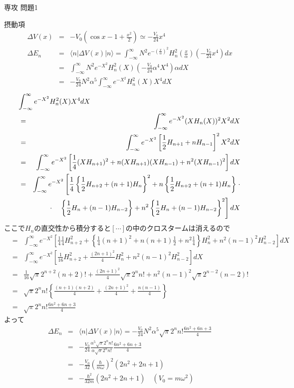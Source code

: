 \documentclass[fleqn]{jbook}
\begin{document}
\begin{answer}{専攻 問題1}{}
\begin{subanswers}
\begin{subsubanswers}
\SubSubAnswer
摂動項
\begin{eqnarray*}
\Delta V(x)&=&-V_{0}\left(\cos x -1+\frac{x^{2}}{2}\right)
\simeq -\frac{V_{0}}{24}x^{4}\\
\Delta E_{n}&=&\langle n|\Delta V(x)|n\rangle
=\int_{-\infty}^{\infty}N^{2}e^{-
\left(\frac{x}{\alpha}\right)^{2}}H_{n}^{2}\left(\frac{x}{\alpha}\right)
\left(-\frac{V_{0}}{24}x^{4}\right)dx\\
&=&\int_{-\infty}^{\infty}N^{2}e^{-X^{2}}H_{n}^{2}(X)\left(-\frac{V_{0}}{24}
\alpha^{4}X^{4}\right)\alpha dX\\
&=&-\frac{V_{0}}{24}N^{2}\alpha^{5}\int_{-\infty}^{\infty}e^{-X^{2}}H_{n}^{2}(X)X^{4}dX
\end{eqnarray*}
\begin{eqnarray*}
\lefteqn{\int_{-\infty}^{\infty}e^{-X^{2}}H_{n}^{2}(X)X^{4}dX}&&\\
&=&\int_{-\infty}^{\infty}e^{-X^{2}}(XH_{n}(X))^{2}X^{2}dX\\
&=&\int_{-\infty}^{\infty}e^{-X^{2}}\left[
\frac{1}{2}H_{n+1}+nH_{n-1}\right]^{2}X^{2}dX\\
&=&\int_{-\infty}^{\infty}e^{-X^{2}}\left[\frac{1}{4}(XH_{n+1})^{2}
+n(XH_{n+1})(XH_{n-1})+n^{2}(XH_{n-1})^{2}\right]dX\\
&=&\int_{-\infty}^{\infty}e^{-X^{2}}\left[\frac{1}{4}\left\{\frac{1}{2}H_{n+2}
+(n+1)H_{n}\right\}^{2}+n\left\{
\frac{1}{2}H_{n+2}+(n+1)H_{n}\right\}\right.\cdot\\
&&\cdot\left.\quad\left\{\frac{1}{2}H_{n}+(n-1)
H_{n-2}\right\}+n^{2}\left\{\frac{1}{2}H_{n}+(n-1)H_{n-2}\right\}^{2}\right]dX
\end{eqnarray*}
ここで$H_{n}$の直交性から積分すると$[\cdots]$の中のクロスタームは消えるので
\begin{eqnarray*}
&=&\int_{-\infty}^{\infty}e^{-X^{2}}\left[\frac{1}{4}\frac{1}{4}H_{n+2}^{2}
+\left\{\frac{1}{4}(n+1)^{2}+n(n+1)\frac{1}{2}+n^{2}\frac{1}{4}\right\}
H_{n}^{2}
+n^{2}(n-1)^{2}H_{n-2}^{2}\right]dX\\
&=&\int_{-\infty}^{\infty}e^{-X^{2}}\left[\frac{1}{16}H_{n+2}^{2}
+\frac{(2n+1)^{2}}{4}H_{n}^{2}+n^{2}(n-1)^{2}H_{n-2}^{2}\right]dX\\
&=&\frac{1}{16}\sqrt{\pi}2^{n+2}(n+2)!+\frac{(2n+1)^{2}}{4}\sqrt{\pi}2^{n}n!+
n^{2}(n-1)^{2}\sqrt{\pi}2^{n-2}(n-2)!\\
&=&\sqrt{\pi}2^{n}n!\left\{\frac{(n+1)(n+2)}{4}+\frac{(2n+1)^{2}}{4}+
\frac{n(n-1)}{4}\right\}\\
&=&\sqrt{\pi}2^{n}n!\frac{6n^{2}+6n+3}{4}
\end{eqnarray*}
よって
\begin{eqnarray*}
\Delta E_n&=&\langle n|\Delta V(x)|n\rangle
=-\frac{V_{0}}{24}N^{2}\alpha^{5}\sqrt{\pi}2^{n}n!
\frac{6n^{2}+6n+3}{4}\\
&=&-\frac{V_{0}}{24}\frac{\alpha^{5}\sqrt{\pi}2^{n}n!}{\alpha\sqrt{\pi}2^{n}n!}
\frac{6n^{2}+6n+3}{4}\\
&=&-\frac{V_{0}}{32}\left(\frac{\hbar}{m\omega}\right)^{2}(2n^{2}+2n+1)\\
&=&-\frac{\hbar^{2}}{32m}(2n^{2}+2n+1)\quad (V_{0}=m\omega^{2})
\end{eqnarray*}
%


\end{subsubanswers}
\end{subanswers}
\end{answer}
\end{document}
